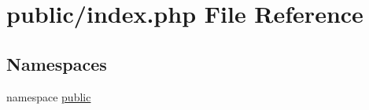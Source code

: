 \hypertarget{public_2index_8php}{
\section{public/index.php File Reference}
\label{public_2index_8php}
}
\subsection*{Namespaces}
\begin{CompactItemize}
\item 
namespace \hyperlink{namespacepublic}{public}
\end{CompactItemize}

